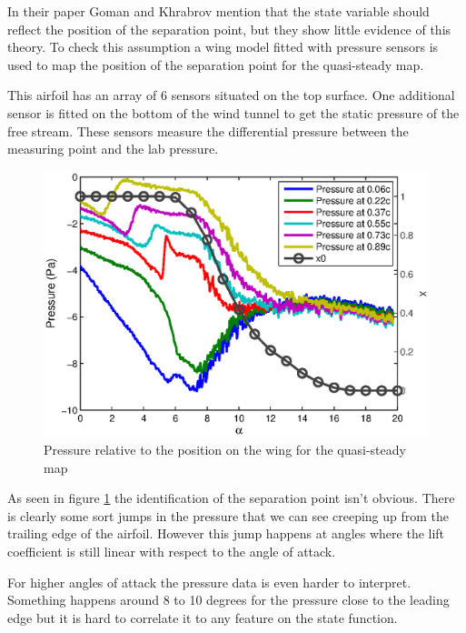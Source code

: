 \FloatBarrier

In their paper Goman and Khrabrov \cite{GK} mention that the state variable should reflect the position of the separation point, but they show little evidence of this theory.
To check this assumption a wing model fitted with pressure sensors is used to map the position of the separation point for the quasi-steady map.

\par This airfoil has an array of 6 sensors situated on the top surface.
One additional sensor is fitted on the bottom of the wind tunnel to get the static pressure of the free stream.
These sensors measure the differential pressure between the measuring point and the lab pressure.

\begin{figure}[h]
  \centering
  \includegraphics{./Figures/NACA0012_pressure_x0_vs_alpha.eps}
  \caption{Pressure relative to the position on the wing for the quasi-steady map}
  \label{fig:P_diff}
\end{figure}

\par As seen in figure \ref{fig:P_diff} the identification of the separation point isn't obvious.
There is clearly some sort jumps in the pressure that we can see creeping up from the trailing edge of the airfoil.
However this jump happens at angles where the lift coefficient is still linear with respect to the angle of attack.

\par For higher angles of attack the pressure data is even harder to interpret.
Something happens around 8 to 10 degrees for the pressure close to the leading edge but it is hard to correlate it to any feature on the state function.

